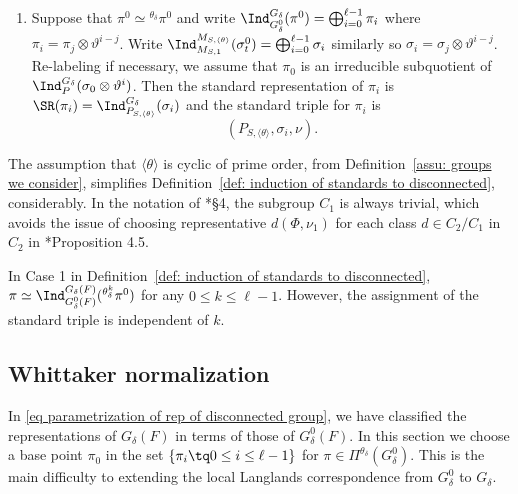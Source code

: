 \documentclass[11pt,letterpaper]{amsart}
\numberwithin{equation}{section}
\begin{document}
\begin{definition}
\begin{enumerate}
\item [Case 2.] 
Suppose that $\pi^0 \simeq {}^{\theta_{\delta}}{\pi}^0$ and write $\Ind_{G^0_\delta}^{G_\delta}(\pi^0)=\bigoplus_{i=0}^{\ell -1} \pi_i$ where $\pi_{i}= \pi_j\otimes \vartheta^{i-j} $. Write $\Ind_{M_{{S},1}}^{M_{{S}, \langle \theta \rangle}}(\sigma_t^0)= \bigoplus_{i=0}^{\ell -1} \sigma_{i}$ similarly so 
    $\sigma_i = \sigma_j \otimes \vartheta^{i-j}$.
Re-labeling if necessary, we assume that $\pi_0$ is an irreducible subquotient of $\Ind_{P}^{G_\delta}(\sigma_0\otimes \vartheta^i)$. Then the standard representation of $\pi_i$ is $\SR(\pi_i)= \Ind_{P_{{S},\langle \theta \rangle}}^{G_\delta} ( \sigma_{i})$ and the standard triple for $\pi_i$ is 
    \[
    (P_{{S}, \langle \theta \rangle}, \sigma_i, \nu).
    \]
\end{enumerate}
\end{definition}


\begin{remark}\label{remark: BJ01}
The assumption that $\langle \theta\rangle$ is cyclic of prime order, from Definition~\ref{assu: groups we consider}, simplifies Definition~\ref{def: induction of standards to disconnected}, considerably. 
    In the notation of \cite{BJ01}*{\S4}, the subgroup $C_1$ is always trivial, which avoids the issue of choosing representative $d(\Phi,\nu_1)$ for each class $d \in C_2/C_1$ in $C_2$ in  \cite{BJ01}*{Proposition 4.5}.  
\end{remark}


\begin{remark}
    In Case 1 in Definition~\ref{def: induction of standards to disconnected}, $\pi\simeq \Ind_{G^0_{\delta}(F)}^{G_{\delta}(F)}({}^{\theta_{\delta}^k}\pi^0)$ for any $0 \leq k \leq \ell-1$. However, the assignment of the standard triple is independent of $k$.
\end{remark}



\subsection{Whittaker normalization}\label{sec Whittaker normalization}

In \eqref{eq parametrization of rep of disconnected group}, we have classified the representations of $G_\delta(F)$ in terms of those of $G^0_\delta(F)$.
In this section we choose a base point $\pi_0$ in the set $\{\pi_i \tq 0 \leq i \leq \ell -1\}$ for $\pi \in \Pi^{\theta_{\delta}}(G_{\delta}^0)$. This is the main difficulty to extending the local Langlands correspondence from $G^0_\delta$ to $G_\delta$. 
\end{document}
